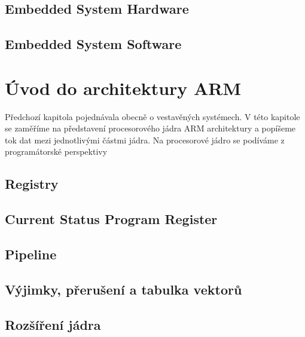 {  \subsection{Embedded System Hardware}
  \subsection{Embedded System Software}

\section{Úvod do architektury ARM}
  Předchozí kapitola pojednávala obecně o vestavěných systémech. V této kapitole se zaměříme na 
  představení procesorového jádra ARM architektury a popíšeme tok dat mezi jednotlivými částmi 
  jádra. Na procesorové jádro se podíváme z programátorské perspektivy 
  
  
  \subsection{Registry}
  \subsection{Current Status Program Register}
  \subsection{Pipeline}
  \subsection{Výjimky, přerušení a tabulka vektorů}
  \subsection{Rozšíření jádra}
}
